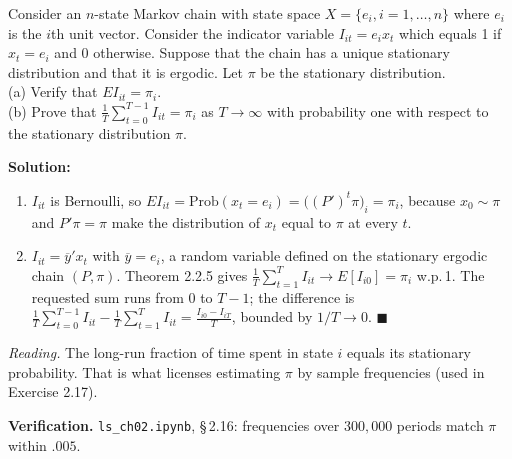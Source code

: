 \documentclass[12pt, letterpaper]{article}
\newcommand{\yb}{\overline{y}}
\newcommand{\nb}[1]{\texttt{ls\_ch02.ipynb}, \S\,#1}
\begin{document}
\begin{tcolorbox}[evenbox,title={Exercise 2.16 \quad Law of Large Numbers for Indicators}]
\begin{tcolorbox}[questionbox]
Consider an $n$-state Markov chain with state space $X=\{e_i,i=1,\dots,n\}$ where $e_i$ is the $i$th
unit vector. Consider the indicator variable $I_{it}=e_ix_t$ which equals 1 if $x_t=e_i$ and 0
otherwise. Suppose that the chain has a unique stationary distribution and that it is ergodic. Let
$\pi$ be the stationary distribution.\\[3pt]
(a) Verify that $EI_{it}=\pi_i$.\\
(b) Prove that $\frac1T\sum_{t=0}^{T-1}I_{it}=\pi_i$ as $T\to\infty$ with probability one with respect
to the stationary distribution $\pi$.
\end{tcolorbox}

\textbf{Solution:}

\begin{enumerate}
\item $I_{it}$ is Bernoulli, so $EI_{it}=\text{Prob}(x_t=e_i)=\big((P')^t\pi\big)_i=\pi_i$, because
$x_0\sim\pi$ and $P'\pi=\pi$ make the distribution of $x_t$ equal to $\pi$ at every $t$.
\item $I_{it}=\yb'x_t$ with $\yb=e_i$, a random variable defined on the stationary ergodic chain
$(P,\pi)$. Theorem 2.2.5 gives $\frac1T\sum_{t=1}^TI_{it}\to E[I_{i0}]=\pi_i$ w.p.\,1. The requested
sum runs from $0$ to $T-1$; the difference is
$\frac1T\sum_{t=0}^{T-1}I_{it}-\frac1T\sum_{t=1}^{T}I_{it}=\frac{I_{i0}-I_{iT}}{T}$, bounded by
$1/T\to0$. $\blacksquare$
\end{enumerate}
\emph{Reading.} The long-run fraction of time spent in state $i$ equals its stationary
probability. That is what licenses estimating $\pi$ by sample frequencies (used in Exercise 2.17).

\textbf{Verification.} \nb{2.16}: frequencies over $300{,}000$ periods match $\pi$ within $.005$. \checkmark
\end{tcolorbox}
\end{document}
